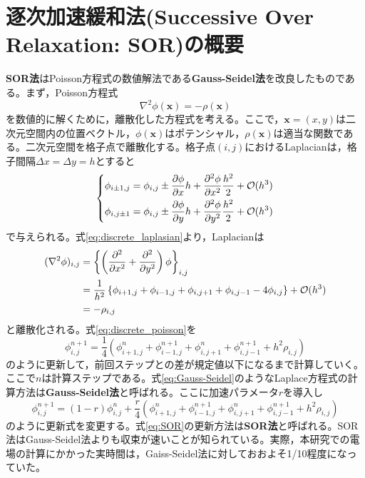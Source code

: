 \documentclass[autodetect-engine,dvi=dvipdfmx,a4paper,ja=standard,oneside,openany]{bxjsbook}
\begin{document}
\chapter{逐次加速緩和法(Successive Over Relaxation: SOR)の概要}
\label{sec:SOR}
\textbf{SOR法}はPoisson方程式の数値解法である\textbf{Gauss-Seidel法}を改良したものである。まず，Poisson方程式
\begin{equation}
  \nabla^2\phi(\bm{x})=-\rho(\bm{x})
  \label{eq:poisson}
\end{equation}
を数値的に解くために，離散化した方程式を考える。ここで，$\bm{x}=(x,y)$は二次元空間内の位置ベクトル，$\phi(\bm{x})$はポテンシャル，$\rho(\bm{x})$は適当な関数である。二次元空間を格子点で離散化する。格子点$(i,j)$におけるLaplacianは，格子間隔$\Delta x=\Delta y=h$とすると
\begin{equation}
  \left\{
  \begin{aligned}
    \phi_{i\pm1,j} & =\phi_{i,j}\pm \pdv{\phi}{x}h+\pdv[2]{\phi}{x}\frac{h^2}{2}+\mathcal{O}(h^3) \\
    \phi_{i,j\pm1} & =\phi_{i,j}\pm \pdv{\phi}{y}h+\pdv[2]{\phi}{y}\frac{h^2}{2}+\mathcal{O}(h^3)
  \end{aligned}
  \right.
  \label{eq:discrete_laplasian}
\end{equation}
で与えられる。式\eqref{eq:discrete_laplasian}より，Laplacianは
\begin{equation}
  \begin{split}
    (\nabla^2\phi)_{i,j} & =\left\{\left(\pdv*[2]{}{x}+\pdv*[2]{}{y}\right)\phi\right\}_{i,j}                                            \\
                         & =\frac{1}{h^2}\left\{\phi_{i+1,j}+\phi_{i-1,j}+\phi_{i,j+1}+\phi_{i,j-1}-4\phi_{i,j}\right\}+\mathcal{O}(h^3) \\
                         & =-\rho_{i,j}
  \end{split}
  \label{eq:discrete_poisson}
\end{equation}
と離散化される。式\eqref{eq:discrete_poisson}を
\begin{equation}
  \phi_{i,j}^{n+1}=\frac{1}{4}\left(\phi_{i+1,j}^{n}+\phi_{i-1,j}^{n+1}+\phi_{i,j+1}^{n}+\phi_{i,j-1}^{n+1}+h^2\rho_{i,j}\right)
  \label{eq:Gauss-Seidel}
\end{equation}
のように更新して，前回ステップとの差が規定値以下になるまで計算していく。ここで$n$は計算ステップである。式\ref{eq:Gauss-Seidel}のようなLaplace方程式の計算方法は\textbf{Gauss-Seidel法}と呼ばれる。ここに加速パラメータ$r$を導入し
\begin{equation}
  \phi_{i,j}^{n+1}=(1-r)\phi_{i,j}^{n}+\frac{r}{4}\left(\phi_{i+1,j}^{n}+\phi_{i-1,j}^{n+1}+\phi_{i,j+1}^{n}+\phi_{i,j-1}^{n+1}+h^2\rho_{i,j}\right)
  \label{eq:SOR}
\end{equation}
のように更新式を変更する。式\ref{eq:SOR}の更新方法は\textbf{SOR法}と呼ばれる。SOR法はGauss-Seidel法よりも収束が速いことが知られている。実際，本研究での電場の計算にかかった実時間は，Gaiss-Seidel法に対しておおよそ1/10程度になっていた。
\end{document}
